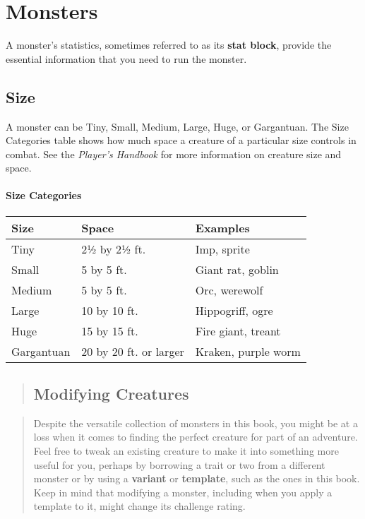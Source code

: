 \documentclass[
]{article}
\date{}
\begin{document}
\hypertarget{monsters}{%
\section{Monsters}\label{monsters}}

A monster's statistics, sometimes referred to as its \textbf{stat
block}, provide the essential information that you need to run the
monster.

\hypertarget{size}{%
\subsection{Size}\label{size}}

A monster can be Tiny, Small, Medium, Large, Huge, or Gargantuan. The
Size Categories table shows how much space a creature of a particular
size controls in combat. See the \emph{Player's Handbook} for more
information on creature size and space.

\hypertarget{size-categories}{%
\paragraph{Size Categories}\label{size-categories}}

\begin{longtable}[]{@{}lll@{}}
\toprule
Size & Space & Examples\tabularnewline
\midrule
\endhead
Tiny & 2½ by 2½ ft. & Imp, sprite\tabularnewline
Small & 5 by 5 ft. & Giant rat, goblin\tabularnewline
Medium & 5 by 5 ft. & Orc, werewolf\tabularnewline
Large & 10 by 10 ft. & Hippogriff, ogre\tabularnewline
Huge & 15 by 15 ft. & Fire giant, treant\tabularnewline
Gargantuan & 20 by 20 ft. or larger & Kraken, purple worm\tabularnewline
\bottomrule
\end{longtable}

\begin{quote}
\hypertarget{modifying-creatures}{%
\subsection{Modifying Creatures}\label{modifying-creatures}}
\end{quote}

\begin{quote}
Despite the versatile collection of monsters in this book, you might be
at a loss when it comes to finding the perfect creature for part of an
adventure. Feel free to tweak an existing creature to make it into
something more useful for you, perhaps by borrowing a trait or two from
a different monster or by using a \textbf{variant} or \textbf{template},
such as the ones in this book. Keep in mind that modifying a monster,
including when you apply a template to it, might change its challenge
rating.
\end{quote}
\end{document}
